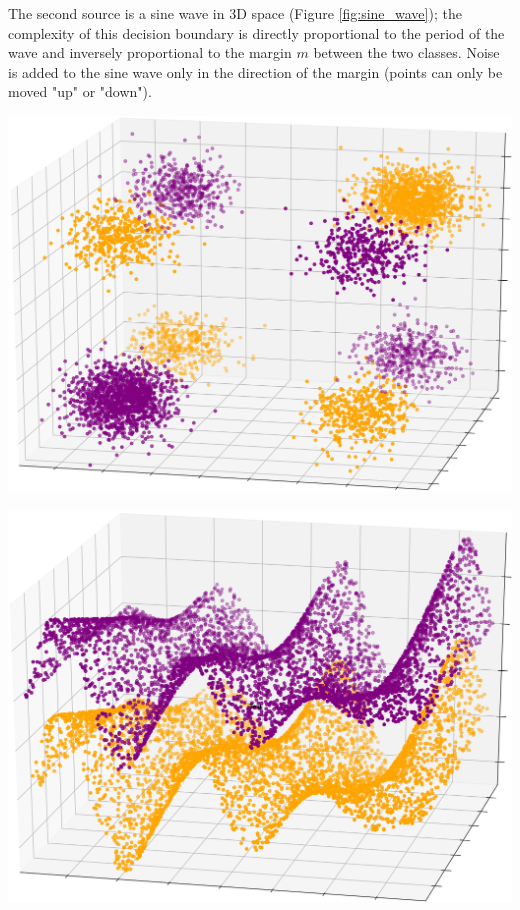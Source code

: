 \documentclass{article}
\begin{document}
The second source is a sine wave in 3D space (Figure \ref{fig:sine_wave}); the
complexity of this decision boundary is directly proportional to the period of
the wave and inversely proportional to the margin $m$ between the two classes.
Noise is added to the sine wave only in the direction of the margin (points can
only be moved "up" or "down").

\begin{minipage}{\textwidth}
\begin{minipage}{.48\textwidth}
    \centering
    \includegraphics[width=\textwidth]{xor_3d_square.png}
    \label{fig:xor}
\end{minipage}
\hspace{.04\textwidth}
\begin{minipage}{.48\textwidth}
    \centering
    \includegraphics[width=\textwidth]{sine_wave_square.png}

\end{minipage}
\end{minipage}
\end{document}
